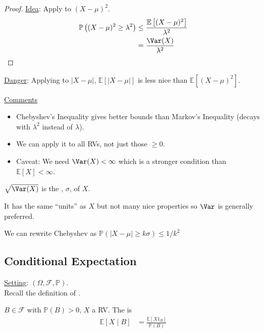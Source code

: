 \begin{proof}
    \underline{Idea}: Apply  to $(X - \mu)^2$.
    \begin{align*}
        \mathbb{P}\left( (X - \mu)^2 \geq \lambda^2 \right) &\leq \frac{\mathbb{E}\left[ (X - \mu)^2 \right]}{\lambda^2} \\
        &= \frac{\Var(X)}{\lambda^2}
    \end{align*} 
\end{proof} 

\color{red} \underline{Danger}: Applying  to $|X - \mu|$, $\mathbb{E}\left[|X - \mu|\right]$ is less nice than $\mathbb{E}\left[ (X - \mu)^2 \right]$. \color{black}

\underline{Comments}
\begin{itemize}
    \item Chebyshev's Inequality gives better bounds than Markov's Inequality (decays with $\lambda^2$ instead of $\lambda$).
    \item We can apply it to all RVs, not just those $\geq 0$.
    \item Caveat: We need $\Var(X) < \infty$ which is a stronger condition than $\mathbb{E}[X] < \infty$.
\end{itemize} 

\begin{definition}
    $\sqrt{\Var(X)}$ is the , $\sigma$, of $X$.
\end{definition} 
It has the same ``units'' as $X$ but not many nice properties so $\Var$ is generally preferred.

We can rewrite Chebyshev as $\mathbb{P}(|X - \mu| \geq k \sigma) \leq 1 / k^2$

\subsection{Conditional Expectation}
\underline{Setting}: $(\Omega, \mathcal{F}, \mathbb{P})$. \\
Recall the definition of . 

\begin{definition}
    $B \in \mathcal{F}$ with $\mathbb{P}(B) > 0$, $X$ a RV.
    The  is 
    \begin{align*}
        \mathbb{E}[X \mid B] &= \frac{\mathbb{E}[X 1_{B}]}{\mathbb{P}(B)}
    \end{align*} 
\end{definition} 

